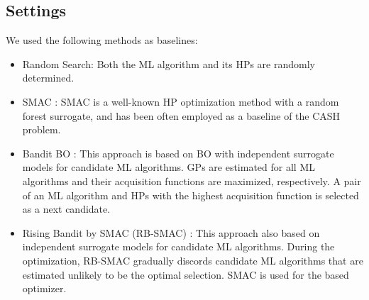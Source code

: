 \subsection{Settings}
\label{ssec:experimental_setup}

We used the following methods as baselines:
\begin{itemize}
 \item %
	Random Search\cite{bergstra2012random}: Both the ML algorithm and its HPs are randomly determined.

 \item %
       SMAC \cite{hutter2011sequential}: SMAC is a well-known HP optimization method with a random forest surrogate, and has been often employed as a baseline of the CASH problem.

  \item %
	Bandit BO \cite{nguyen2020bayesian}: This approach is based on BO with independent surrogate models for candidate ML algorithms.
	GPs are estimated for all ML algorithms and their acquisition functions are maximized, respectively.
	A pair of an ML algorithm and HPs with the highest acquisition function is selected as a next candidate. 

 \item %
       Rising Bandit by SMAC (RB-SMAC) \cite{li2020efficient}: This approach also based on independent surrogate models for candidate ML algorithms.
       During the optimization, RB-SMAC gradually discords candidate ML algorithms that are estimated unlikely to be the optimal selection.
       SMAC is used for the based optimizer. 
 

\end{itemize}
